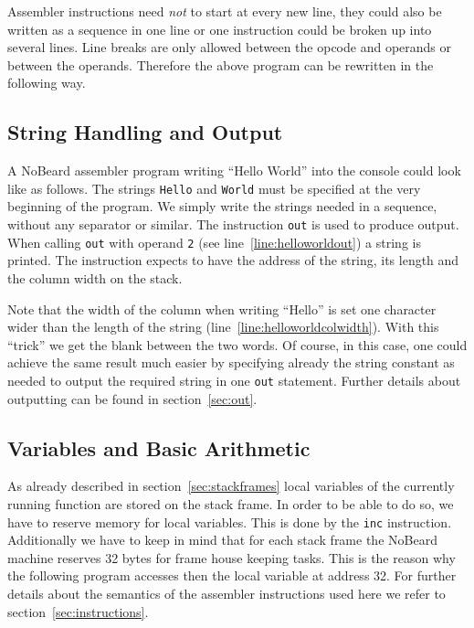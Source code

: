 \documentclass[11pt]{report}
\newcommand{\leongage}{NoBeard}
\begin{document}
Assembler instructions need {\em not} to start at every new line, they could also be written as a sequence in one line or one instruction could be broken up into several lines. Line breaks are only allowed between the opcode and operands or between the operands. Therefore the above program can be rewritten in the following way.


\subsection{String Handling and Output}
A \leongage{} assembler program writing ``Hello World'' into the console could look like as follows. The strings \lstinline$Hello$ and \lstinline$World$ must be specified at the very beginning of the program. We simply write the strings needed in a sequence, without any separator or similar. The instruction \lstinline$out$ is used to produce output. When calling \lstinline$out$ with operand \lstinline$2$ (see line~\ref{line:helloworldout}) a string is printed. The instruction expects to have the address of the string, its length and the column width on the stack.



Note that the width of the column when writing ``Hello'' is set one character wider than the length of the string (line~\ref{line:helloworldcolwidth}). With this ``trick'' we get the blank between the two words. Of course, in this case, one could achieve the same result much easier by specifying already the string constant as needed to output the required string in one \lstinline$out$ statement. Further details about outputting can be found in section~\ref{sec:out}.

\subsection{Variables and Basic Arithmetic}
As already described in section~\ref{sec:stackframes} local variables of the currently running function are stored on the stack frame. In order to be able to do so, we have to reserve memory for local variables. This is done by the \lstinline$inc$ instruction. Additionally we have to keep in mind that for each stack frame the \leongage{} machine reserves 32 bytes for frame house keeping tasks. This is the reason why the following program accesses then the local variable at address 32. For further details about the semantics of the assembler instructions used here we refer to section~\ref{sec:instructions}.
\end{document}

